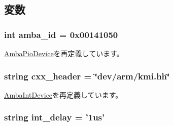 \subsection{変数}
\hypertarget{classRealView_1_1Pl050_a38d7b9edfe6f0eea7a54e7e4f6253f3a}{
\subsubsection[{amba\_\-id}]{\setlength{\rightskip}{0pt plus 5cm}int {\bf amba\_\-id} = 0x00141050}}
\label{classRealView_1_1Pl050_a38d7b9edfe6f0eea7a54e7e4f6253f3a}


\hyperlink{classRealView_1_1AmbaPioDevice_ad9d2b9e37de5c1c7c10219fc1b834599}{AmbaPioDevice}を再定義しています。\hypertarget{classRealView_1_1Pl050_a17da7064bc5c518791f0c891eff05fda}{
\subsubsection[{cxx\_\-header}]{\setlength{\rightskip}{0pt plus 5cm}string {\bf cxx\_\-header} = \char`\"{}dev/arm/kmi.hh\char`\"{}}}
\label{classRealView_1_1Pl050_a17da7064bc5c518791f0c891eff05fda}


\hyperlink{classRealView_1_1AmbaIntDevice_a17da7064bc5c518791f0c891eff05fda}{AmbaIntDevice}を再定義しています。\hypertarget{classRealView_1_1Pl050_a143e0c2b2724ac7fcad9543c09b949ef}{
\subsubsection[{int\_\-delay}]{\setlength{\rightskip}{0pt plus 5cm}string {\bf int\_\-delay} = '1us'}}
\label{classRealView_1_1Pl050_a143e0c2b2724ac7fcad9543c09b949ef}


